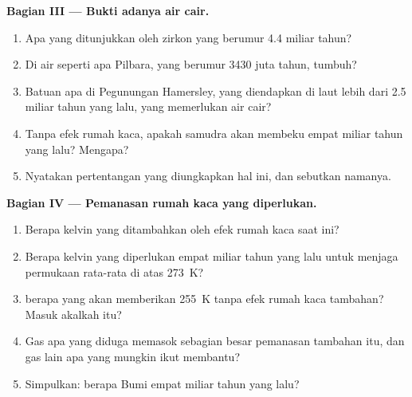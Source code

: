 \begin{problem}
\medskip
\noindent\textbf{Bagian III --- Bukti adanya air cair.}
\begin{enumerate}[resume]
  \item Apa yang ditunjukkan oleh zirkon yang berumur 4.4 miliar tahun?
  \item Di air seperti apa  Pilbara, yang berumur \num{3430} juta
        tahun, tumbuh?
  \item Batuan apa di Pegunungan Hamersley, yang diendapkan di laut lebih dari
        2.5 miliar tahun yang lalu, yang memerlukan air cair?
  \item Tanpa efek rumah kaca, apakah samudra akan membeku empat miliar tahun
        yang lalu? Mengapa?
  \item Nyatakan pertentangan yang diungkapkan hal ini, dan sebutkan namanya.
\end{enumerate}

\medskip
\noindent\textbf{Bagian IV --- Pemanasan rumah kaca yang diperlukan.}
\begin{enumerate}[resume]
  \item Berapa kelvin yang ditambahkan oleh efek rumah kaca saat ini?
  \item Berapa kelvin yang diperlukan empat miliar tahun yang lalu untuk
        menjaga permukaan rata-rata di atas \qty{273}{K}?
  \item {} berapa yang akan memberikan \qty{255}{K} tanpa efek rumah kaca
        tambahan? Masuk akalkah itu?
  \item Gas apa yang diduga memasok sebagian besar pemanasan tambahan itu, dan
        gas lain apa yang mungkin ikut membantu?
  \item Simpulkan: berapa  Bumi empat miliar tahun yang lalu?
\end{enumerate}
\end{problem}
